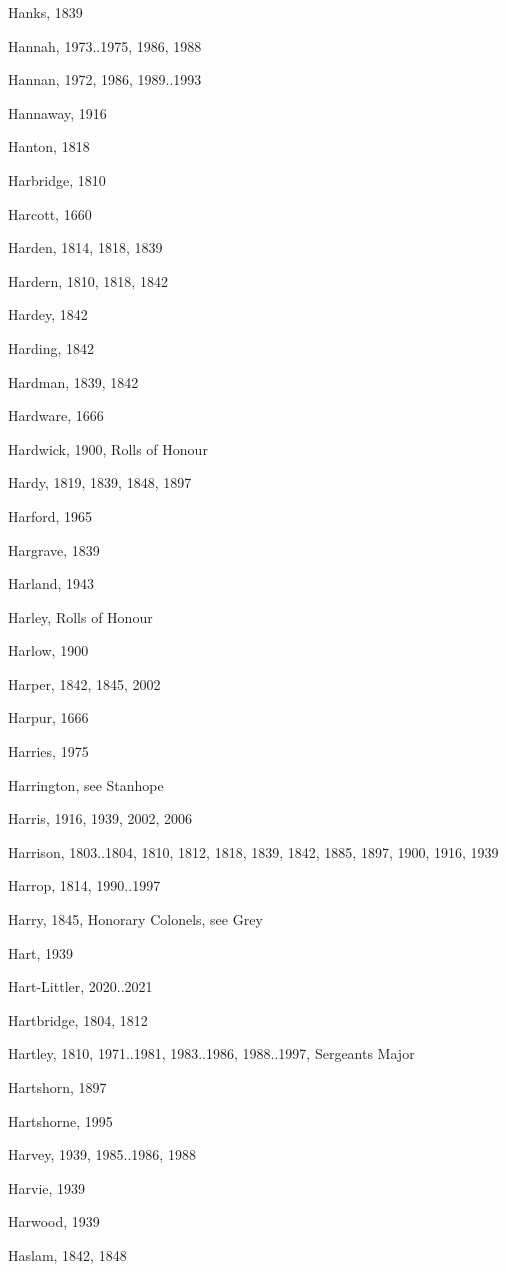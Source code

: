 {\begin{theindex}
\item Hanks, 1839
\item Hannah, 1973..1975, 1986, 1988
\item Hannan, 1972, 1986, 1989..1993
\item Hannaway, 1916
\item Hanton, 1818
\item Harbridge, 1810
\item Harcott, 1660
\item Harden, 1814, 1818, 1839
\item Hardern, 1810, 1818, 1842
\item Hardey, 1842
\item Harding, 1842
\item Hardman, 1839, 1842
\item Hardware, 1666
\item Hardwick, 1900, Rolls of Honour
\item Hardy, 1819, 1839, 1848, 1897
\item Harford, 1965
\item Hargrave, 1839
\item Harland, 1943
\item Harley, Rolls of Honour
\item Harlow, 1900
\item Harper, 1842, 1845, 2002
\item Harpur, 1666
\item Harries, 1975
\item Harrington, see Stanhope
\item Harris, 1916, 1939, 2002, 2006
\item Harrison, 1803..1804, 1810, 1812, 1818, 1839, 1842, 1885, 1897, 1900, 1916, 1939
\item Harrop, 1814, 1990..1997
\item Harry, 1845, Honorary Colonels, see Grey
\item Hart, 1939
\item Hart-Littler, 2020..2021
\item Hartbridge, 1804, 1812
\item Hartley, 1810, 1971..1981, 1983..1986, 1988..1997, Sergeants Major
\item Hartshorn, 1897
\item Hartshorne, 1995
\item Harvey, 1939, 1985..1986, 1988
\item Harvie, 1939
\item Harwood, 1939
\item Haslam, 1842, 1848

\end{theindex}}
